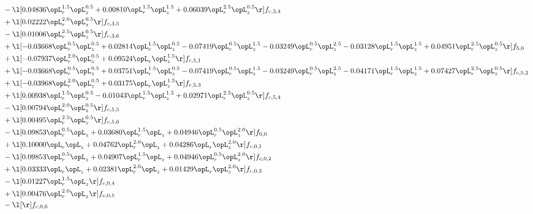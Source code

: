 \begin{alignat}{2}
& - \l[  0.04836 \opL_r^{1.5} \opL_z^{0.5} +  0.00810 \opL_r^{1.5} \opL_z^{1.5} +  0.06039 \opL_r^{2.5} \opL_z^{0.5}  \r] f_{c,3,4} \nonumber \\ 
& + \l[  0.02222 \opL_r^{2.0} \opL_z^{0.5}  \r] f_{c,3,5} \nonumber \\ 
& - \l[  0.01006 \opL_r^{2.5} \opL_z^{0.5}  \r] f_{c,3,6} \nonumber \\ 
& + \l[  -0.03668 \opL_r^{0.5} \opL_z^{0.5} +  0.02814 \opL_r^{1.5} \opL_z^{0.5}   -0.07419 \opL_r^{0.5} \opL_z^{1.5}   -0.03249 \opL_r^{0.5} \opL_z^{2.5}   -0.03128 \opL_r^{1.5} \opL_z^{1.5} +  0.04951 \opL_r^{2.5} \opL_z^{0.5}  \r] f_{5,0} \nonumber \\ 
& + \l[  -0.07937 \opL_r^{2.0} \opL_z^{0.5} +  0.09524 \opL_r \opL_z^{1.5}  \r] f_{c,5,1} \nonumber \\ 
& + \l[  -0.03668 \opL_r^{0.5} \opL_z^{0.5} +  0.03751 \opL_r^{1.5} \opL_z^{0.5}   -0.07419 \opL_r^{0.5} \opL_z^{1.5}   -0.03249 \opL_r^{0.5} \opL_z^{2.5}   -0.04171 \opL_r^{1.5} \opL_z^{1.5} +  0.07427 \opL_r^{2.5} \opL_z^{0.5}  \r] f_{c,5,2} \nonumber \\ 
& + \l[  -0.03968 \opL_r^{2.0} \opL_z^{0.5} +  0.03175 \opL_r \opL_z^{1.5}  \r] f_{c,5,3} \nonumber \\ 
& + \l[  0.00938 \opL_r^{1.5} \opL_z^{0.5}   -0.01043 \opL_r^{1.5} \opL_z^{1.5} +  0.02971 \opL_r^{2.5} \opL_z^{0.5}  \r] f_{c,5,4} \nonumber \\ 
& - \l[  0.00794 \opL_r^{2.0} \opL_z^{0.5}  \r] f_{c,5,5} \nonumber \\ 
& + \l[  0.00495 \opL_r^{2.5} \opL_z^{0.5}  \r] f_{c,5,6} \nonumber \\ 
& - \l[  0.09853 \opL_r^{0.5} \opL_z +  0.03680 \opL_r^{1.5} \opL_z +  0.04946 \opL_r^{0.5} \opL_z^{2.0}  \r] f_{0,0} \nonumber \\ 
& + \l[  0.10000 \opL_r \opL_z +  0.04762 \opL_r^{2.0} \opL_z +  0.04286 \opL_r \opL_z^{2.0}  \r] f_{c,0,1} \nonumber \\ 
& - \l[  0.09853 \opL_r^{0.5} \opL_z +  0.04907 \opL_r^{1.5} \opL_z +  0.04946 \opL_r^{0.5} \opL_z^{2.0}  \r] f_{c,0,2} \nonumber \\ 
& + \l[  0.03333 \opL_r \opL_z +  0.02381 \opL_r^{2.0} \opL_z +  0.01429 \opL_r \opL_z^{2.0}  \r] f_{c,0,3} \nonumber \\ 
& - \l[  0.01227 \opL_r^{1.5} \opL_z  \r] f_{c,0,4} \nonumber \\ 
& + \l[  0.00476 \opL_r^{2.0} \opL_z  \r] f_{c,0,5} \nonumber \\ 
& - \l[  \r] f_{c,0,6} \nonumber \\ 

\end{alignat}
